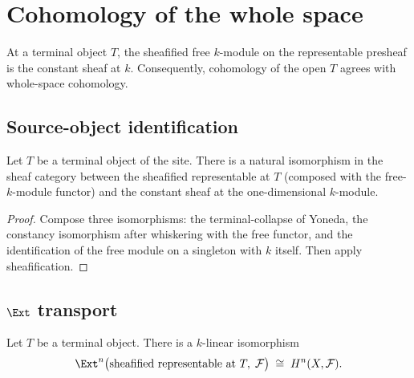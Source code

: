 \section{Cohomology of the whole space}
\label{sec:cover_totality}

At a terminal object \(T\), the sheafified free \(k\)-module on the representable presheaf is the constant sheaf at \(k\). Consequently, cohomology of the open \(T\) agrees with whole-space cohomology.

\subsection{Source-object identification}

\begin{definition}\leanok
  \label{def:Scheme_HModule_prime_top_sourceIso}

  Let \(T\) be a terminal object of the site. There is a natural isomorphism in the sheaf category between the sheafified representable at \(T\) (composed with the free-\(k\)-module functor) and the constant sheaf at the one-dimensional \(k\)-module.
\end{definition}

\begin{proof}


\leanok
  Compose three isomorphisms: the terminal-collapse of Yoneda, the constancy isomorphism after whiskering with the free functor, and the identification of the free module on a singleton with \(k\) itself. Then apply sheafification.
\end{proof}

\subsection{\(\Ext\) transport}

\begin{definition}\leanok
  \label{def:Scheme_HModule_top_linearEquiv}

  Let \(T\) be a terminal object. There is a \(k\)-linear isomorphism
  \[
    \Ext^{n}\bigl(\text{sheafified representable at }T,\; \mathcal F\bigr) \;\cong\; H^{n}(X, \mathcal F).
  \]
\end{definition}

